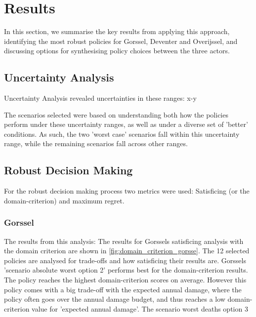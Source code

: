 \section{Results}
\label{s:results}

In this section, we summarise the key results from applying this approach, identifying the most robust policies for Gorssel, Deventer and Overijssel, and discussing options for synthesising policy choices between the three actors.


\subsection{Uncertainty Analysis}
Uncertainty Analysis revealed uncertainties in these ranges: x-y

The scenarios selected were based on understanding both how the policies perform under these uncertainty ranges, as well as under a diverse set of 'better' conditions. As such, the two 'worst case' scenarios fall within this uncertainty range, while the remaining scenarios fall across other ranges.


\subsection{Robust Decision Making}
For the robust decision making process two metrics were used: Satisficing (or the domain-criterion) and maximum regret. 
\subsubsection{Gorssel}
The results from this analysis: The results for Gorssels satisficing analysis with the domain criterion are shown in \autoref{fig:domain_criterion_gorsse}. The 12 selected policies are analysed for trade-offs and how satisficing their results are. \newline
Gorssels 'scenario absolute worst option 2' performs best for the domain-criterion results. The policy reaches the highest domain-criterion scores on average. However this policy comes with a big trade-off with the expected annual damage, where the policy often goes over the annual damage budget, and thus reaches a low domain-criterion value for 'expected annual damage'. The scenario worst deaths option 3 






